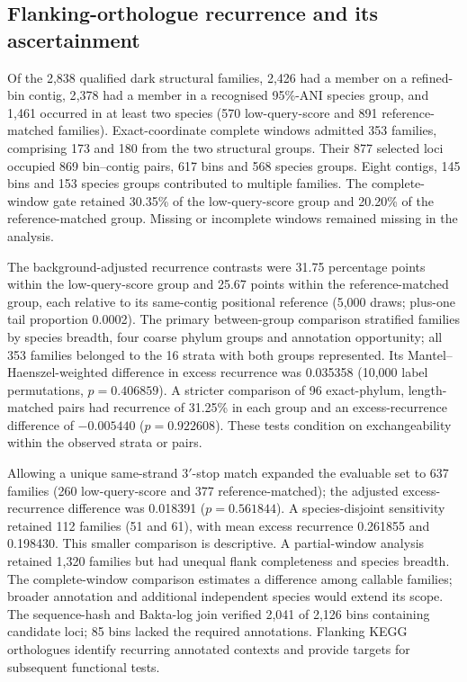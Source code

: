 \subsection*{Flanking-orthologue recurrence and its ascertainment}
Of the 2{,}838 qualified dark structural families, 2{,}426 had a member on a refined-bin contig,
2{,}378 had a member in a recognised 95\%-ANI species group, and 1{,}461 occurred in at least
two species (570 low-query-score and 891 reference-matched families).
Exact-coordinate complete windows admitted 353 families, comprising 173 and 180 from the two
structural groups. Their 877 selected loci occupied 869 bin--contig pairs, 617 bins and 568
species groups. Eight contigs, 145 bins and 153 species groups contributed to multiple families.
The complete-window gate retained 30.35\% of the low-query-score group and 20.20\% of the
reference-matched group. Missing or incomplete windows remained missing in the analysis.

The background-adjusted recurrence contrasts were 31.75 percentage points within the
low-query-score group and 25.67 points within the reference-matched group, each relative to
its same-contig positional reference (5{,}000 draws; plus-one tail proportion 0.0002).
The primary between-group comparison stratified families by species breadth, four coarse
phylum groups and annotation opportunity; all 353 families belonged to the 16 strata with
both groups represented. Its Mantel--Haenszel-weighted difference in excess recurrence was
0.035358 (10{,}000 label permutations, $p=0.406859$). A stricter comparison of 96 exact-phylum,
length-matched pairs had recurrence of 31.25\% in each group and an excess-recurrence difference
of $-0.005440$ ($p=0.922608$). These tests condition on exchangeability within the observed
strata or pairs.

Allowing a unique same-strand 3$'$-stop match expanded the evaluable set to 637 families
(260 low-query-score and 377 reference-matched); the adjusted excess-recurrence difference
was 0.018391 ($p=0.561844$). A species-disjoint sensitivity retained 112 families
(51 and 61), with mean excess recurrence 0.261855 and 0.198430. This smaller comparison is
descriptive. A partial-window analysis retained 1{,}320 families but had unequal flank
completeness and species breadth. The complete-window comparison estimates a difference among
callable families; broader annotation and additional independent species would extend its scope.
The sequence-hash and Bakta-log join verified 2{,}041 of 2{,}126 bins containing candidate loci;
85 bins lacked the required annotations. Flanking KEGG orthologues identify recurring annotated
contexts and provide targets for subsequent functional tests.

